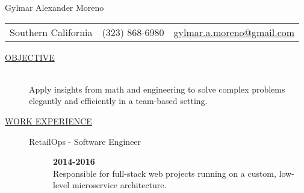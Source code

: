 \documentclass[11pt]{article}
\begin{document}
    \begin{center}
        {\LARGE Gylmar Alexander Moreno}
        \\
        \begin{tabular}{l|l|l}
            Southern California & (323) 868-6980 &
            \href{mailto:gylmar.a.moreno@gmail.com}{gylmar.a.moreno@gmail.com}
        \end{tabular}
    \end{center}
\begin{description}
    \item[\underline{OBJECTIVE}] \hfill \\
        Apply insights from math and engineering to solve complex problems elegantly and efficiently in a team-based setting.

    \item[\underline{WORK EXPERIENCE}] \hfill
		\begin{description}
            \item[RetailOps - Software Engineer] \hfill \textbf{2014-2016}\\
                \hspace{-9mm}Responsible for full-stack web projects running on a custom, low-level microservice architecture.


\end{description}
\end{description}
\end{document}
